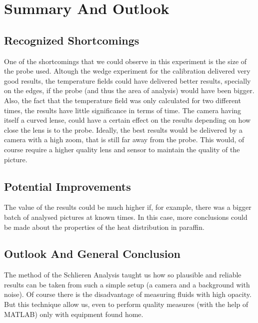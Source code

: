 \chapter{Summary And Outlook}\label{sec:conclusion}



\section{Recognized Shortcomings}

One of the shortcomings that we could observe in this experiment is the size of the probe used. Altough the wedge experiment for the calibration delivered very good results, the temperature fields could have delivered better results, specially on the edges, if the probe (and thus the area of analysis) would have been bigger. Also, the fact that the temperature field was only calculated for two different times, the results have little significance in terms of time. The camera having itself a curved lense, could have a certain effect on the results depending on how close the lens is to the probe. Ideally, the best results would be delivered by a camera with a high zoom, that is still far away from the probe. This would, of course require a higher quality lens and sensor to maintain the quality of the picture.


\section{Potential Improvements}

The value of the results could be much higher if, for example, there was a bigger batch of analysed pictures at known times. In this case, more conclusions could be made about the properties of the heat distribution in paraffin.


\section{Outlook And General Conclusion}

The method of the Schlieren Analysis taught us how so plausible and reliable results can be taken from such a simple setup (a camera and a background with noise). Of course there is the disadvantage of measuring fluids with high opacity. But this technique allow us, even to perform quality measures (with the help of MATLAB) only with equipment found home.
